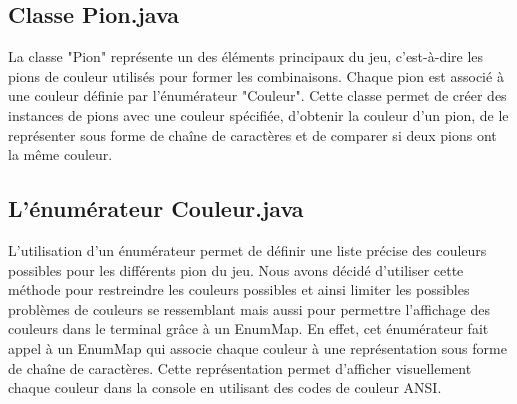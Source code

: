 \documentclass[french]{article}
\begin{document}
\subsection{Classe Pion.java}
La classe "Pion" représente un des éléments principaux du jeu, c'est-à-dire les pions de couleur utilisés pour former les combinaisons. Chaque pion est associé à une couleur définie par l'énumérateur "Couleur". Cette classe permet de créer des instances de pions avec une couleur spécifiée, d'obtenir la couleur d'un pion, de le représenter sous forme de chaîne de caractères et de comparer si deux pions ont la même couleur.

\subsection{L'énumérateur Couleur.java}
L'utilisation d'un énumérateur permet de définir une liste précise des couleurs possibles pour les différents pion du jeu. Nous avons décidé d'utiliser cette méthode pour restreindre les couleurs possibles et ainsi limiter les possibles problèmes de couleurs se ressemblant mais aussi pour permettre l'affichage des couleurs dans le terminal grâce à un EnumMap. En effet, cet énumérateur fait appel à un EnumMap qui associe chaque couleur à une représentation sous forme de chaîne de caractères. Cette représentation permet d'afficher visuellement chaque couleur dans la console en utilisant des codes de couleur ANSI.
\end{document}

